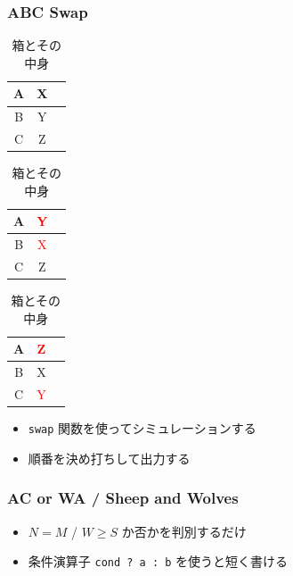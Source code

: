 \documentclass[t, aspectratio=169, dvipdfmx]{beamer}
\begin{document}
\begin{frame}[c]
\end{frame}
\begin{frame}[containsverbatim]
  \frametitle{ABC Swap}
  \begin{table}
    \caption{箱とその中身}
    \begin{minipage}{0.3\hsize}
      \begin{center}
        \begin{tabular}{|c|c|c|} \hline
          A & X \\ \hline
          B & Y \\ \hline
          C & Z \\ \hline
        \end{tabular}
      \end{center}
    \end{minipage}
    \begin{minipage}{0.3\hsize}
      \begin{center}
        \begin{tabular}{|c|c|c|} \hline
          A & \textcolor{red}{Y} \\ \hline
          B & \textcolor{red}{X} \\ \hline
          C & Z \\ \hline
        \end{tabular}
      \end{center}
    \end{minipage}
    \begin{minipage}{0.3\hsize}
      \begin{center}
        \begin{tabular}{|c|c|c|} \hline
          A & \textcolor{red}{Z} \\ \hline
          B & X \\ \hline
          C & \textcolor{red}{Y} \\ \hline
        \end{tabular}
      \end{center}
    \end{minipage}
  \end{table}
  \begin{itemize}
    \item \verb|swap| 関数を使ってシミュレーションする
    \item 順番を決め打ちして出力する
  \end{itemize}
\end{frame}

\begin{frame}[containsverbatim]
  \frametitle{AC or WA / Sheep and Wolves}
  \begin{itemize}
    \item $N=M$ / $W \geq S$ か否かを判別するだけ
    \item 条件演算子 \verb|cond ? a : b| を使うと短く書ける
  \end{itemize}
\end{frame}
\end{document}
